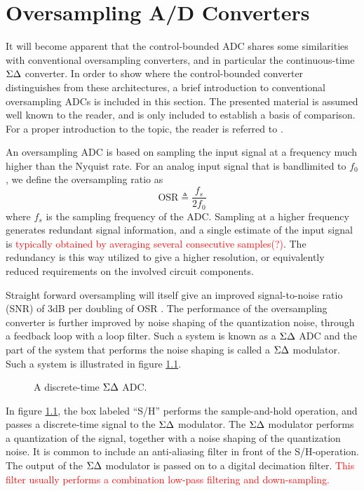 
\chapter{Oversampling A/D Converters}
\label{sec:theory}
It will become apparent that the control-bounded ADC shares some similarities with conventional oversampling converters, and in particular the continuous-time $\Sigma\Delta$ converter. In order to show where the control-bounded converter distinguishes from these architectures, a brief introduction to conventional oversampling ADCs is included in this section. The presented material is assumed well known to the reader, and is only included to establish a basis of comparison. For a proper introduction to the topic, the reader is referred to \cite{johns_martin}.

An oversampling ADC is based on sampling the input signal at a frequency much higher than the Nyquist rate. For an analog input signal that is bandlimited to $f_0$, we define the oversampling ratio as
\begin{equation}
    \text{OSR} \triangleq \frac{f_s}{2f_0}
\end{equation}
where $f_s$ is the sampling frequency of the ADC. Sampling at a higher frequency generates redundant signal information, and a single estimate of the input signal is \textcolor{red}{typically obtained by averaging several consecutive samples(?)}. The redundancy is this way utilized to give a higher resolution, or equivalently reduced requirements on the involved circuit components.

Straight forward oversampling will itself give an improved signal-to-noise ratio (SNR) of 3dB per doubling of OSR \cite{johns_martin}. The performance of the oversampling converter is further improved by noise shaping of the quantization noise, through a feedback loop with a loop filter. Such a system is known as a $\Sigma\Delta$ ADC and the part of the system that performs the noise shaping is called a $\Sigma\Delta$ modulator. Such a system is illustrated in figure \ref{fig:dtsdmod}.
\begin{figure}[htbp]
    
    \centering
    \caption{A discrete-time $\Sigma\Delta$ ADC.}
    \label{fig:dtsdmod}
\end{figure}
In figure \ref{fig:dtsdmod}, the box labeled \enquote{S/H} performs the sample-and-hold operation, and passes a discrete-time signal to the $\Sigma\Delta$ modulator. The $\Sigma\Delta$ modulator performs a quantization of the signal, together with a noise shaping of the quantization noise. It is common to include an anti-aliasing filter in front of the S/H-operation. The output of the $\Sigma\Delta$ modulator is passed on to a digital decimation filter.\textcolor{red}{ This filter usually performs a combination low-pass filtering and down-sampling.}

